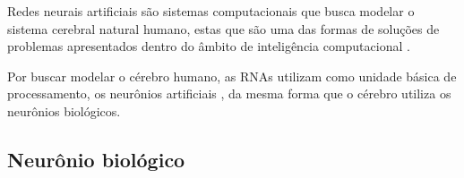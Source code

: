 
\par Redes neurais artificiais são sistemas computacionais que busca modelar o sistema cerebral natural humano, estas que são uma das formas de soluções de problemas apresentados dentro do âmbito de inteligência computacional \cite{Cintra2019}.

\par Por buscar modelar o cérebro humano, as RNAs utilizam como unidade básica de processamento, os neurônios artificiais \cite{Haykin2001}, da mesma forma que o cérebro utiliza os neurônios biológicos. %



\subsection{Neurônio biológico}

